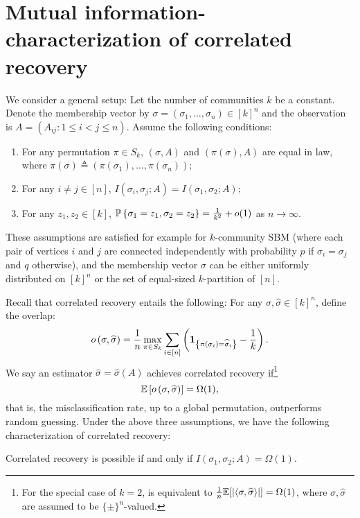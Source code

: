 \section{Mutual information-characterization of correlated recovery}
\label{app:MIcorr}

\newcommand{\Unif}{\mathrm{Unif}}


We consider a general setup:  Let the number of communities $k$ be a constant. Denote the membership vector by $\sigma=(\sigma_1,\ldots,\sigma_n) \in [k]^n$ and the observation is $A=(A_{ij}: 1 \leq i < j \leq n)$. Assume the following conditions:
\begin{enumerate}[label=A\arabic*]
	\item \label{A1}
	For any permutation $\pi\in S_k$, $(\sigma,A)$ and $(\pi(\sigma),A)$ are equal in law, where $\pi(\sigma)\triangleq (\pi(\sigma_1),\ldots,\pi(\sigma_n))$; 
	
	\item \label{A2}
	For any $i \neq j \in [n]$, $I(\sigma_i,\sigma_j;A)= I(\sigma_1,\sigma_2;A)$;
	
	\item \label{A3}
	For any $z_1,z_2 \in [k]$, $\mathbb{P}\left\{ \sigma_1=z_1,\sigma_2=z_2 \right\} = \frac{1}{k^2} + o(1)$ as $n\to \infty$.
\end{enumerate}
These assumptions are satisfied for example for $k$-community SBM (where each pair of vertices $i$ and $j$ are connected independently with probability $p$ if $\sigma_i=\sigma_j$ and $q$ otherwise),
 and the membership vector
$\sigma$ can be either uniformly distributed on $[k]^n$ or the set of equal-sized $k$-partition of $[n]$. 

Recall that correlated recovery entails the following:
For any $\sigma , \hat{\sigma} \in [k]^n$, define the overlap:
\begin{align}
o\left( \sigma, \widehat{\sigma} \right) = \frac{1}{n} \max_{\pi \in S_k} 
\sum_{i \in [n] } \left( {\mathbf{1}_{\left\{{ \pi\left(\sigma_i \right) = \widehat{\sigma}_i}\right\}}} - \frac{1}{k} \right).
\end{align}
We say an estimator $\hat{\sigma} = \hat{\sigma}(A)$ achieves correlated recovery if\footnote{For the special case of $k=2$,  is equivalent to 
$\frac{1}{n}\mathbb{E}[|\langle \sigma, \widehat \sigma \rangle|] = \Omega(1)$, where $\sigma , \hat{\sigma}$ are assumed to be $\{\pm\}^n$-valued.}
\begin{equation}
\mathbb{E}\left[ o\left( \sigma, \widehat{\sigma} \right) \right]=\Omega(1),
\label{eq:corro}
\end{equation}
 that is, the misclassification rate, up to a global permutation, outperforms random guessing.
Under the above three assumptions, we have the following characterization of correlated recovery:
\begin{lemma}
\label{lmm:MIcorr}	
Correlated recovery is possible if and only if 
$I(\sigma_1, \sigma_2 ; A) = \Omega(1)$.	
\end{lemma}



